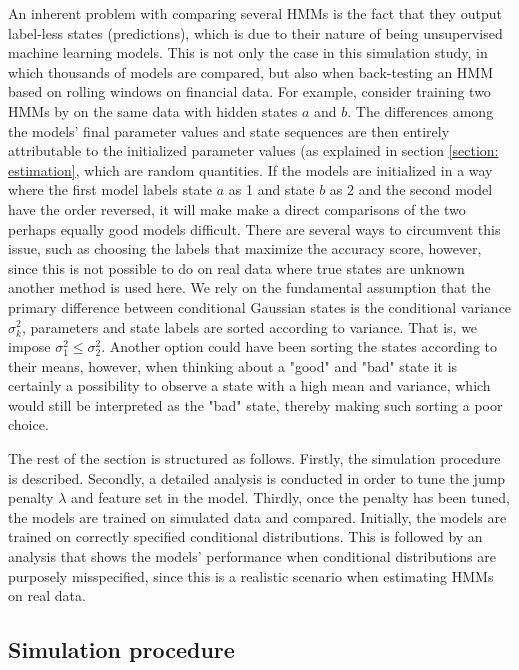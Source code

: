 An inherent problem with comparing several HMMs is the fact that they output label-less states (predictions), which is due to their nature of being unsupervised machine learning models. This is not only the case in this simulation study, in which thousands of models are compared, but also when back-testing an HMM based on rolling windows on financial data. For example, consider training two HMMs by \mle on the same data with hidden states $a$ and $b$. The differences among the models' final parameter values and state sequences are then entirely attributable to the initialized parameter values (as explained in section \ref{section: estimation}, which are random quantities. If the models are initialized in a way where the first model labels state $a$ as 1 and state $b$ as 2 and the second model have the order reversed, it will make make a direct comparisons of the two perhaps equally good models difficult. There are several ways to circumvent this issue, such as choosing the labels that maximize the accuracy score, however, since this is not possible to do on real data where true states are unknown another method is used here. We rely on the fundamental assumption that the primary difference between conditional Gaussian states is the conditional variance $\sigma_k^2$, parameters and state labels are sorted according to variance. That is, we impose $\sigma_1^2 \leq \sigma_2^2$. Another option could have been sorting the states according to their means, however, when thinking about a "good" and "bad" state it is certainly a possibility to observe a state with a high mean and variance, which would still be interpreted as the "bad" state, thereby making such sorting a poor choice.


The rest of the section is structured as follows. Firstly, the simulation procedure is described. Secondly, a detailed analysis is conducted in order to tune the jump penalty $\lambda$ and feature set in the \jump model. Thirdly, once the penalty has been tuned, the models are trained on simulated data and compared. Initially, the models are trained on correctly specified conditional distributions. This is followed by an analysis that shows the models' performance when conditional distributions are purposely misspecified, since this is a realistic scenario when estimating HMMs on real data.

\subsection{Simulation procedure}

